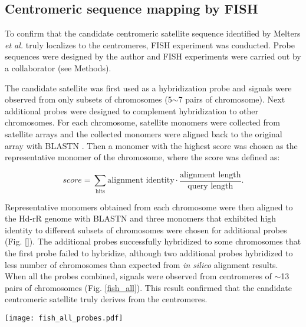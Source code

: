 

\subsection*{Centromeric sequence mapping by FISH}
  To confirm that the candidate centromeric satellite sequence identified by Melters \textit{et al.} \cite{Melters2013} truly localizes to the centromeres, FISH experiment was conducted. Probe sequences were designed by the author and FISH experiments were carried out by a collaborator (see Methods).

  The candidate satellite was first used as a hybridization probe and signals were observed from only subsets of chromosomes (5$\sim$7 pairs of chromosome). Next additional probes were designed to complement hybridization to other chromosomes. For each chromosome, satellite monomers were collected from satellite arrays and the collected monomers were aligned back to the original array with BLASTN \cite{}. Then a monomer with the highest score was chosen as the representative monomer of the chromosome, where the score was defined as:


  \[
    score = \sum_{\mbox{hits}} \mbox{alignment identity} \cdot \frac{\mbox{alignment length}}{\mbox{query length}}.
  \]

  Representative monomers obtained from each chromosome were then aligned to the Hd-rR genome with BLASTN and three monomers that exhibited high identity to different subsets of chromosomes were chosen for additional probes (Fig. \ref{}). The additional probes successfully hybridized to some chromosomes that the first probe failed to hybridize, although two additional probes hybridized to less number of chromosomes than expected from \textit{in silico} alignment results. When all the probes combined, signals were observed from centromeres of $\sim$13 pairs of chromosomes (Fig. \ref{fish_all}). This result confirmed that the candidate centromeric satellite truly derives from the centromeres.

  \begin{figure*}[htp]
    \centering
    \texttt{[image: fish\_all\_probes.pdf]}
    \caption{
      The candidate centromeric satellite sequence and three derivative sequences localized to the centromeres of $\sim$13 pairs of chromosomes. (left) DNA is stained with DAPI. (center) probes are stained green. (right) two images are combined.
    }
    \label{fish_all}
  \end{figure*}


